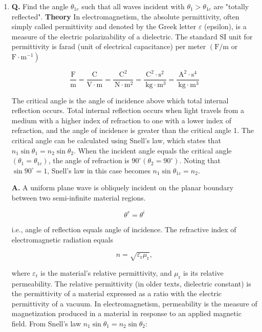 \documentclass[main.tex]{subfiles}
\begin{document}
\begin{enumerate}
    \begin{enumerate}
        \item \textbf{Q.} Find the angle $\theta_{1c}$ such that all waves incident with $\theta_1 > \theta_{1c}$ are "totally reflected". \textbf{Theory} In electromagnetism, the absolute permittivity, often simply called permittivity and denoted by the Greek letter $\varepsilon$ (epsilon), is a measure of the electric polarizability of a dielectric. The standard $\mathrm{SI}$ unit for permittivity is farad (unit of electrical capacitance) per meter $\left(\mathrm{F} / \mathrm{m}\right.$ or $\left.\mathrm{F} \cdot \mathrm{m}^{-1}\right)$

        $$
        \frac{\mathrm{F}}{\mathrm{m}}=\frac{\mathrm{C}}{\mathrm{V} \cdot \mathrm{m}}=\frac{\mathrm{C}^2}{\mathrm{~N} \cdot \mathrm{m}^2}=\frac{\mathrm{C}^2 \cdot \mathrm{s}^2}{\mathrm{~kg} \cdot \mathrm{m}^3}=\frac{\mathrm{A}^2 \cdot \mathrm{s}^4}{\mathrm{~kg} \cdot \mathrm{m}^3}
        $$
                
        The critical angle is the angle of incidence above which total internal reflection occurs. Total internal reflection occurs when light travels from a medium with a higher index of refraction to one with a lower index of refraction, and the angle of incidence is greater than the critical angle 1. The critical angle can be calculated using Snell's law, which states that $n_1 \sin \theta_1=n_2 \sin \theta_2$. When the incident angle equals the critical angle $\left(\theta_1=\theta_{1 c}\right)$, the angle of refraction is $90^{\circ}\left(\theta_2=90^{\circ}\right)$. Noting that $\sin 90^{\circ}=1$, Snell's law in this case becomes $n_1 \sin \theta_{1 c}=n_2$. 
        
        \textbf{A.} A uniform plane wave is obliquely incident on the planar boundary between two semi-infinite material regions. 
        
        $$
        \theta^r=\theta^i
        $$
        
        i.e., angle of reflection equals angle of incidence. The refractive index of electromagnetic radiation equals
        
        $$
        n=\sqrt{\varepsilon_{\mathrm{r}} \mu_{\mathrm{r}}},
        $$
        
        where $\varepsilon_{\mathrm{r}}$ is the material's relative permittivity, and $\mu_{\mathrm{r}}$ is its relative permeability. The relative permittivity (in older texts, dielectric constant) is the permittivity of a material expressed as a ratio with the electric permittivity of a vacuum. In electromagnetism, permeability is the measure of magnetization produced in a material in response to an applied magnetic field. From Snell's law $n_1 \sin \theta_1=n_2 \sin \theta_2$:
        

\end{enumerate}
\end{enumerate}
\end{document}
